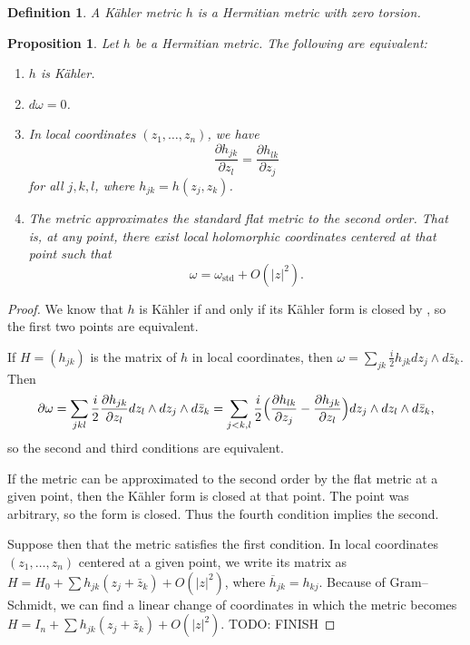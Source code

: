 \documentclass[10pt,a4paper]{article}
\newtheorem{prop}[theo]{Proposition}
\newtheorem{defi}[theo]{Definition}
\newtheorem*{proof}{Proof}
\begin{document}
\begin{defi}
A \emph{K\"ahler metric} $h$ is a Hermitian metric with zero torsion.
\end{defi}


\begin{prop}
Let $h$ be a Hermitian metric. The following are equivalent:
\begin{enumerate}
\item $h$ is K\"ahler.
\item $d\omega = 0$.
\item In local coordinates $(z_1,\ldots,z_n)$, we have
\[
\frac{\partial h_{jk}}{\partial z_l}
= \frac{\partial h_{lk}}{\partial z_j}
\]
for all $j,k,l$, where $h_{jk} = h(z_j,z_k)$.
\item The metric approximates the standard flat metric to the second order. That is, at any point, there exist local holomorphic coordinates centered at that point such that
\[
\omega = \omega_{\text{std}} + O(|z|^2).
\]
\end{enumerate}
\end{prop}

\begin{proof}
We know that $h$ is K\"ahler if and only if its K\"ahler form is closed by , so the first two points are equivalent.

If $H = (h_{jk})$ is the matrix of $h$ in local coordinates, then $\omega = \sum_{jk} \frac i2 h_{jk} dz_j \wedge d\bar z_k$. Then
\[
\partial\omega
= \sum_{jkl} \frac i2 \frac{\partial h_{jk}}{\partial z_l} dz_l \wedge dz_j \wedge d\bar z_k
= \sum_{j<k,l} \frac i2
\Bigl(
\frac{\partial h_{lk}}{\partial z_j}
- \frac{\partial h_{jk}}{\partial z_l}
\Bigr)
dz_j \wedge dz_l \wedge d\bar z_k,
\]
so the second and third conditions are equivalent.

If the metric can be approximated to the second order by the flat metric at a given point, then the K\"ahler form is closed at that point. The point was arbitrary, so the form is closed. Thus the fourth condition implies the second.

Suppose then that the metric satisfies the first condition. In local coordinates $(z_1,\ldots,z_n)$ centered at a given point, we write its matrix as $H = H_0 + \sum h_{jk}(z_j + \bar z_k) + O(|z|^2)$, where $\overline h_{jk} = h_{kj}$. Because of Gram--Schmidt, we can find a linear change of coordinates in which the metric becomes $H = I_n + \sum h_{jk}(z_j + \bar z_k) + O(|z|^2)$.
TODO: FINISH
\end{proof}
\end{document}
